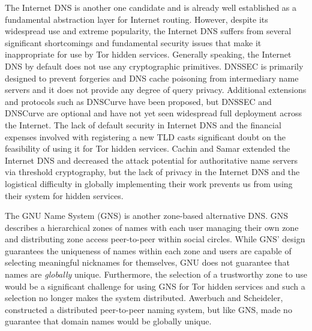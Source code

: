 \documentclass[conference]{IEEEtran}
\begin{document}
The Internet DNS is another one candidate and is already well established as a fundamental abstraction layer for Internet routing. However, despite its widespread use and extreme popularity, the Internet DNS suffers from several significant shortcomings and fundamental security issues that make it inappropriate for use by Tor hidden services. Generally speaking, the Internet DNS by default does not use any cryptographic primitives. DNSSEC is primarily designed to prevent forgeries and DNS cache poisoning from intermediary name servers and it does not provide any degree of query privacy\cite{wachs2014censorship}. Additional extensions and protocols such as DNSCurve\cite{bernstein2009dnscurve} have been proposed, but DNSSEC and DNSCurve are optional and have not yet seen widespread full deployment across the Internet. The lack of default security in Internet DNS and the financial expenses involved with registering a new TLD casts significant doubt on the feasibility of using it for Tor hidden services. Cachin and Samar\cite{cachin2004secure} extended the Internet DNS and decreased the attack potential for authoritative name servers via threshold cryptography, but the lack of privacy in the Internet DNS and the logistical difficulty in globally implementing their work prevents us from using their system for hidden services.

The GNU Name System\cite{wachs2014censorship} (GNS) is another zone-based alternative DNS. GNS describes a hierarchical zones of names with each user managing their own zone and distributing zone access peer-to-peer within social circles. While GNS' design guarantees the uniqueness of names within each zone and users are capable of selecting meaningful nicknames for themselves, GNU does not guarantee that names are \emph{globally} unique. Furthermore, the selection of a trustworthy zone to use would be a significant challenge for using GNS for Tor hidden services and such a selection no longer makes the system distributed. Awerbuch and Scheideler,\cite{awerbuch2004group} constructed a distributed peer-to-peer naming system, but like GNS, made no guarantee that domain names would be globally unique.

\end{document}
